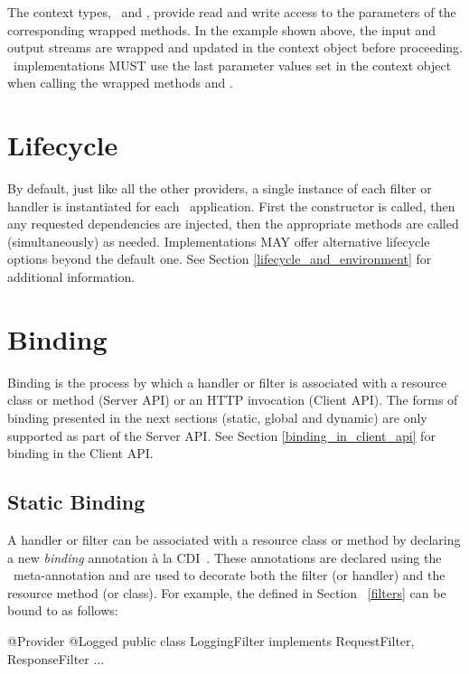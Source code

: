 The context types, \ReadFromHandlerContext\ and \WriteToHandlerContext, provide read and write access to the parameters of the corresponding wrapped methods. In the example shown above, the input and output streams are wrapped and updated in the context object before proceeding. \jaxrs\ implementations MUST use the last parameter values set in the context object when calling the wrapped methods  and .

\section{Lifecycle}

By default, just like all the other providers, a single instance of each filter or handler is instantiated for each \jaxrs\ application. First the constructor is called, then any requested dependencies are injected, then the appropriate methods are called (simultaneously) as needed. Implementations MAY offer alternative lifecycle options beyond the default one. See Section \ref{lifecycle_and_environment} for additional information.

\section{Binding}

Binding is the process by which a handler or filter is associated with a resource class or method (Server API) or an HTTP invocation (Client API). The forms of binding presented in the next sections (static, global and dynamic) are only supported as part of the Server API. See Section \ref{binding_in_client_api} for binding in the Client API.

\subsection{Static Binding}

A handler or filter can be associated with a resource class or method by declaring a new \emph{binding} annotation \`{a} la CDI~\cite{jsr299}. These annotations are declared using the \jaxrs\ meta-annotation \NameBinding and are used to decorate both the filter (or handler) and the resource method (or class). For example, the  defined in Section ~\ref{filters} can be bound to  as follows:

\begin{listing}{1}
@Provider
@Logged
public class LoggingFilter implements RequestFilter, ResponseFilter {
    ...
}
\end{listing}

